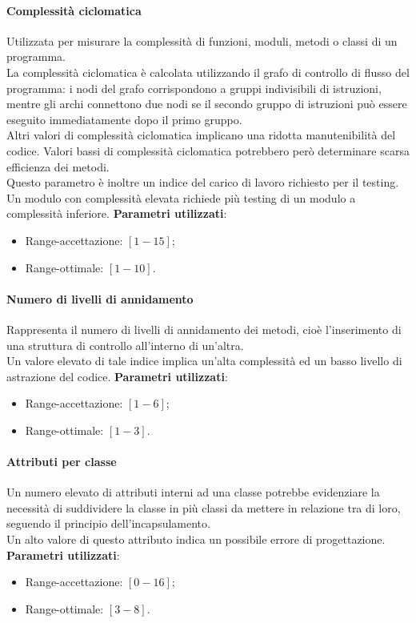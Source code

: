 \paragraph{Complessità ciclomatica}
Utilizzata per misurare la complessità di funzioni, moduli, metodi o classi di un programma.\\
La complessità ciclomatica è calcolata utilizzando il grafo di controllo di flusso del programma: i nodi del grafo corrispondono a gruppi indivisibili di istruzioni, mentre gli archi connettono due nodi se il secondo gruppo di istruzioni può essere eseguito immediatamente dopo il primo gruppo.\\
Altri valori di complessità ciclomatica implicano una ridotta manutenibilità del codice. Valori bassi di complessità ciclomatica potrebbero però determinare scarsa efficienza dei metodi.\\
Questo parametro è inoltre un indice del carico di lavoro richiesto per il testing. Un modulo con complessità elevata richiede più testing di un modulo a complessità inferiore.
\textbf{Parametri utilizzati}:
\begin{itemize}
\item Range-accettazione: $[1-15]$;
\item Range-ottimale: $[1-10]$.
\end{itemize}

\paragraph{Numero di livelli di annidamento}
Rappresenta il numero di livelli di annidamento dei metodi, cioè l'inserimento di una struttura di controllo all'interno di un'altra.\\
Un valore elevato di tale indice implica un'alta complessità ed un basso livello di astrazione del codice.
\textbf{Parametri utilizzati}:
\begin{itemize}
\item Range-accettazione: $[1-6]$;
\item Range-ottimale: $[1-3]$.
\end{itemize}

\paragraph{Attributi per classe}
Un numero elevato di attributi interni ad una classe potrebbe evidenziare la necessità di suddividere la classe in più classi da mettere in relazione tra di loro, seguendo il principio dell'incapsulamento.\\
Un alto valore di questo attributo indica un possibile errore di progettazione.
\textbf{Parametri utilizzati}:
\begin{itemize}
\item Range-accettazione: $[0-16]$;
\item Range-ottimale: $[3-8]$.
\end{itemize}

